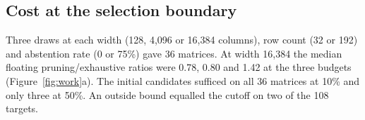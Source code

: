 \subsection{Cost at the selection boundary}\label{sec:frontier}
Three draws at each width (128, 4,096 or 16,384 columns), row count (32 or 192) and abstention rate (0 or 75\%) gave 36 matrices. At width 16,384 the median floating pruning/exhaustive ratios were 0.78, 0.80 and 1.42 at the three budgets (Figure~\ref{fig:work}a). The initial candidates sufficed on all 36 matrices at 10\% and only three at 50\%. An outside bound equalled the cutoff on two of the 108 targets.
